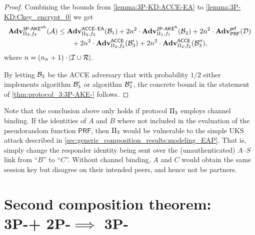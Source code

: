 \begin{proof}
\medskip
Combining the bounds from \cref{lemma:3P-KD:ACCE-EA} to \cref{lemma:3P-KD:Ckey_encrypt_0}
we get
\begin{align*}
	\begin{split}
	\adv_{\protocol_3,f_3}^{\operatorname{\mathsf{3P-\akewfs}}} (\A) 
	&\leq \adv_{\protocol_2,f_2}^{\operatorname{\mathsf{\acce-\EA}}}(\A[B]_1) 
 		 + 2n^2 \cdot \adv_{\protocol_1,f_1}^{\operatorname{\mathsf{2P-\akefs}}}(\A[B]_2) 
		  +	2n^2 \cdot \adv_{\mathsf{PRF}}^{\prf}(\A[D]) \\
	&\qquad + 2n^2 \cdot \adv_{\protocol_2,f_2}^{\acce}(\A[B]'_3)
				+ 2n^2 \cdot \adv_{\protocol_2,f_2}^{\acce}(\A[B]''_3) ,			
	\end{split}
\end{align*} 
where $ n = (\numsessions +1 ) \cdot  | \mathcal{I} \cup \mathcal{R} | $.

By letting $\A[B]_3$ be the ACCE adversary that with probability $1/2$ either implements algorithm $\A[B]'_3$ or algorithm $\A[B]''_3$,
the concrete bound  in the statement of \cref{thm:protocol_3:3P-AKE-} follows.
\end{proof} %

\begin{remark}\label{remark:UKS_attack_on_P3_without_channel_binding}
Note that the conclusion above only holds if protocol $\protocol_3$ employs channel binding.
If the identities of $A$ and $B$ where not included in the evaluation of the pseudorandom function $\mathsf{PRF}$,
then $\protocol_3$ would be vulnerable to the simple UKS attack described in \cref{sec:generic_composition_results:modeling_EAP}.
That is,
simply change the responder identity being sent over the (unauthenticated) $A$--$S$ link from ``$B$'' to ``$C$''.
Without channel binding,
$A$ and $C$ would obtain the same session key but disagree on their intended peers,
and hence not be partners.
\end{remark}










\section[Second composition theorem]{Second composition theorem:\\
{\large\texorpdfstring{3P-\akewfstext + 2P-\akenfstext $\implies$ 3P-\akefstext}{3P-AKEw + 2P-AKEnfs -> 3P-AKEfs}}}\label{sec:generic_composition_results:second_composition_result}

